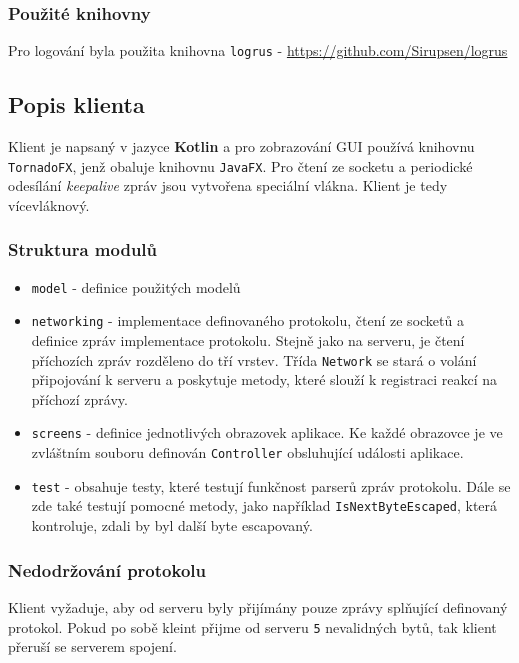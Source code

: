 \documentclass[12pt, a4paper]{article}
\begin{document}
			\subsubsection{Použité knihovny}
			Pro logování byla použita knihovna \texttt{logrus} - \href{https://github.com/Sirupsen/logrus}{https://github.com/Sirupsen/logrus}
	    \subsection{Popis klienta}
	    Klient je napsaný v jazyce \textbf{Kotlin} a pro zobrazování GUI používá knihovnu \texttt{TornadoFX}, jenž obaluje knihovnu \texttt{JavaFX}.
	    Pro čtení ze socketu a periodické odesílání \textit{keepalive} zpráv jsou vytvořena speciální vlákna. Klient je tedy vícevláknový.
   		    \subsubsection{Struktura modulů}
   			\begin{itemize}

	    	\item \texttt{model} - definice použitých modelů
	    	\item \texttt{networking} - implementace definovaného protokolu, čtení ze socketů a definice zpráv implementace protokolu. Stejně jako na serveru, je čtení příchozích zpráv rozděleno do tří vrstev. Třída \texttt{Network} se stará o volání připojování k serveru a poskytuje metody, které slouží k registraci reakcí na příchozí zprávy.
 	    	\item \texttt{screens} - definice jednotlivých obrazovek aplikace. Ke každé obrazovce je ve zvláštním souboru definován \texttt{Controller} obsluhující události aplikace.
			\item \texttt{test} - obsahuje testy, které testují funkčnost parserů zpráv protokolu. Dále se zde také testují pomocné metody, jako například \texttt{IsNextByteEscaped}, která kontroluje, zdali by byl další byte escapovaný.
 	    	\end{itemize}
			\subsubsection{Nedodržování protokolu}
			Klient vyžaduje, aby od serveru byly přijímány pouze zprávy splňující definovaný protokol. Pokud po sobě kleint přijme od serveru \texttt{5} nevalidných bytů, tak klient přeruší se serverem spojení.
\end{document}
